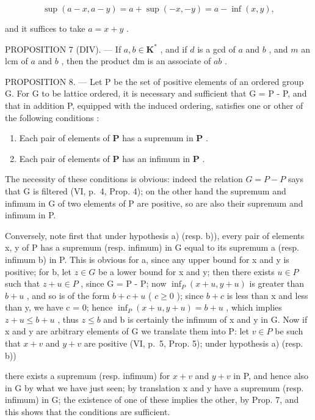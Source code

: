 \[
\sup (a - x, a - y) = a + \sup (- x, - y) = a - \inf (x, y),
\]

and it suffices to take \(a = x + y\) .

PROPOSITION 7 (DIV). --- If \(a, b \in \mathbf{K}^{*}\) , and if \(d\) is a gcd of \(a\) and \(b\) , and \(m\) an lcm of \(a\) and \(b\) , then the product dm is an associate of \(ab\) .

PROPOSITION 8. --- Let P be the set of positive elements of an ordered group G. For G to be lattice ordered, it is necessary and sufficient that G = P - P, and that in addition P, equipped with the induced ordering, satisfies one or other of the following conditions :

\begin{enumerate}
\def\labelenumi{\alph{enumi})}
\item
  Each pair of elements of \(\mathbf{P}\) has a supremum in \(\mathbf{P}\) .
\item
  Each pair of elements of \(\mathbf{P}\) has an infimum in \(\mathbf{P}\) .
\end{enumerate}

The necessity of these conditions is obvious: indeed the relation \(G = P - P\) says that G is filtered (VI, p.~4, Prop. 4); on the other hand the supremum and infimum in G of two elements of P are positive, so are also their supremum and infimum in P.

Conversely, note first that under hypothesis a) (resp. b)), every pair of elements x, y of P has a supremum (resp. infimum) in G equal to its supremum a (resp. infimum b) in P. This is obvious for a, since any upper bound for x and y is positive; for b, let \(z \in G\) be a lower bound for x and y; then there exists \(u \in P\) such that \(z + u \in P\) , since G = P - P; now \(\inf_{P}(x + u, y + u)\) is greater than \(b + u\) , and so is of the form \(b + c + u\) ( \(c \geqslant 0\) ); since \(b + c\) is less than x and less than y, we have c = 0; hence \(\inf_{P}(x + u, y + u) = b + u\) , which implies \(z + u \leqslant b + u\) , thus \(z \leqslant b\) and b is certainly the infimum of x and y in G. Now if x and y are arbitrary elements of G we translate them into P: let \(v \in P\) be such that \(x + v\) and \(y + v\) are positive (VI, p.~5, Prop. 5); under hypothesis a) (resp. b))

there exists a supremum (resp. infimum) for \(x + v\) and \(y + v\) in P, and hence also in G by what we have just seen; by translation x and y have a supremum (resp. infimum) in G; the existence of one of these implies the other, by Prop. 7, and this shows that the conditions are sufficient.

